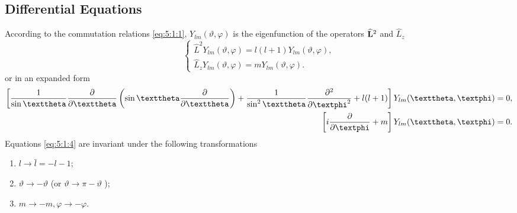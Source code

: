 \subsection{Differential Equations}\label{sec:5.1.2}
According to the commutation relations \eqref{eq:5:1:1}, $Y_{l m}(\vartheta, \varphi)$ is the eigenfunction of the operators $\widehat{\mathbf{L}}^{2}$ and $\widehat{L}_{z}$
\begin{equation}
\left\{\begin{array}{l}
\hat{L}^{2} Y_{l m}(\vartheta, \varphi)=l(l+1) Y_{l m}(\vartheta, \varphi),  \\
\widehat{L}_{z} Y_{l m}(\vartheta, \varphi)=m Y_{l m}(\vartheta, \varphi).
\end{array}\right.\label{eq:5:1:3}
\end{equation}
or in an expanded form
\begin{align}
\left[\frac{1}{\sin \vartheta} \frac{\partial}{\partial \vartheta}\left(\sin \vartheta \frac{\partial}{\partial \vartheta}\right)+\frac{1}{\sin ^{2} \vartheta} \frac{\partial^{2}}{\partial \varphi^{2}}+l(l+1)\right] Y_{l m}(\vartheta, \varphi)&=0, \label{eq:5:1:4}\\
\left[i \frac{\partial}{\partial \varphi}+m\right] Y_{l m}(\vartheta, \varphi)&=0 .\notag
\end{align}
Equations \eqref{eq:5:1:4} are invariant under the following transformations
\begin{enumerate}[label=(\alph*)]
  \item  $l \rightarrow \bar{l}=-l-1$;
\item $\vartheta \rightarrow-\vartheta$ (or $\vartheta \rightarrow \pi-\vartheta$ );
\item $m \rightarrow-m, \varphi \rightarrow-\varphi$.
\end{enumerate}

